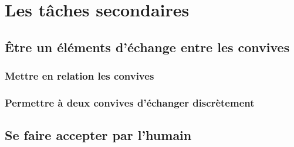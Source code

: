 \section{Les tâches secondaires}

\subsection{\^Etre un éléments d'échange entre les convives}

\subsubsection{Mettre en relation les convives}

\subsubsection{Permettre à deux convives d'échanger discrètement}

\subsection{Se faire accepter par l'humain} 
